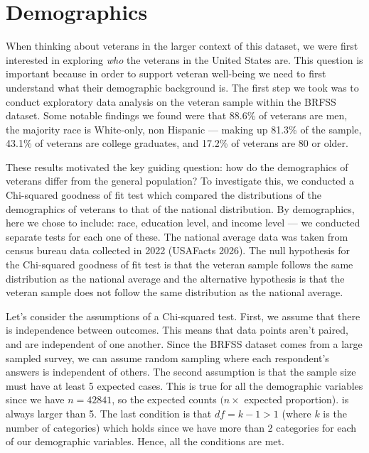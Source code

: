 \documentclass[
  10pt,
  letterpaper,
  DIV=11,
  numbers=noendperiod]{scrartcl}
\begin{document}
\section{Demographics}\label{demographics}

When thinking about veterans in the larger context of this dataset, we
were first interested in exploring \emph{who} the veterans in the United
States are. This question is important because in order to support
veteran well-being we need to first understand what their demographic
background is. The first step we took was to conduct exploratory data
analysis on the veteran sample within the BRFSS dataset. Some notable
findings we found were that 88.6\% of veterans are men, the majority
race is White-only, non Hispanic --- making up 81.3\% of the sample,
43.1\% of veterans are college graduates, and 17.2\% of veterans are 80
or older.

These results motivated the key guiding question: how do the
demographics of veterans differ from the general population? To
investigate this, we conducted a Chi-squared goodness of fit test which
compared the distributions of the demographics of veterans to that of
the national distribution. By demographics, here we chose to include:
race, education level, and income level --- we conducted separate tests
for each one of these. The national average data was taken from census
bureau data collected in 2022 (USAFacts 2026). The null hypothesis for
the Chi-squared goodness of fit test is that the veteran sample follows
the same distribution as the national average and the alternative
hypothesis is that the veteran sample does not follow the same
distribution as the national average.

Let's consider the assumptions of a Chi-squared test. First, we assume
that there is independence between outcomes. This means that data points
aren't paired, and are independent of one another. Since the BRFSS
dataset comes from a large sampled survey, we can assume random sampling
where each respondent's answers is independent of others. The second
assumption is that the sample size must have at least 5 expected cases.
This is true for all the demographic variables since we have
\(n = 42841\), so the expected counts \((n \times\) expected
proportion). is always larger than 5. The last condition is that
\(df  = k-1 > 1\) (where \(k\) is the number of categories) which holds
since we have more than 2 categories for each of our demographic
variables. Hence, all the conditions are met.
\end{document}
